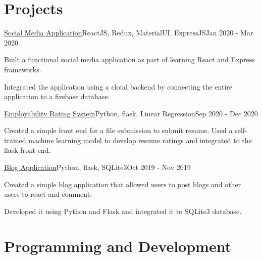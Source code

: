 \documentclass[letterpaper]{resume_config}
\begin{document}
\section{Projects}
\Project
    {\href{https://github.com/yk-2310/Social-app}{Social Media Application}}{ReactJS, Redux, MaterialUI, ExpressJS}{Jan 2020 - Mar 2020}
    {
        \item {Built a functional social media application as part of learning React and Express frameworks.}
        \item {Integrated the application using a cloud backend by connecting the entire application to a firebase database.}
    }
\Project
    {\href{https://github.com/yk-2310/Employability-Rating-System-using-Flask}{Employability Rating System}}{Python, flask, Linear Regression}{Sep 2020 - Dec 2020}
    {
        \item {Created a simple front end for a file submission to submit resume. Used a self-trained machine learning model to develop resume ratings and integrated to the flask front-end.}
    }
\Project
    {\href{https://github.com/yk-2310/Blog-Application}{Blog Application}}{Python, flask, SQLite3}{Oct 2019 - Nov 2019}
    {
        \item {Created a simple blog application that allowed users to post blogs and other users to react and comment.}
        \item {Developed it using Python and Flask and integrated it to SQLite3 database.}
    }
\vspace{-5pt}
\section{Programming and Development}
\begin{URLList}[3][3]
    \item{}
    \item{}
    \item{}
    \item{}
    \item{}
    \item{}
\end{URLList}
\end{document}
